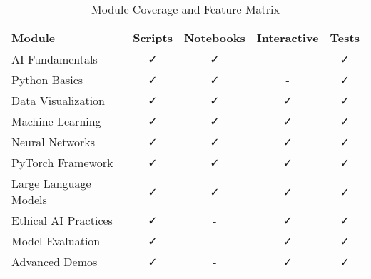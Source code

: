 \begin{table}[H]
\centering
\caption{Module Coverage and Feature Matrix}
\label{tab:module-coverage}
\begin{tabular}{@{}lcccc@{}}
\toprule
\textbf{Module} & \textbf{Scripts} & \textbf{Notebooks} & \textbf{Interactive} & \textbf{Tests} \\
\midrule
AI Fundamentals & ✓ & ✓ & - & ✓ \\
Python Basics & ✓ & ✓ & - & ✓ \\
Data Visualization & ✓ & ✓ & ✓ & ✓ \\
Machine Learning & ✓ & ✓ & ✓ & ✓ \\
Neural Networks & ✓ & ✓ & ✓ & ✓ \\
PyTorch Framework & ✓ & ✓ & ✓ & ✓ \\
Large Language Models & ✓ & ✓ & ✓ & ✓ \\
Ethical AI Practices & ✓ & - & ✓ & ✓ \\
Model Evaluation & ✓ & - & ✓ & ✓ \\
Advanced Demos & ✓ & - & ✓ & ✓ \\
\bottomrule
\end{tabular}
\end{table}